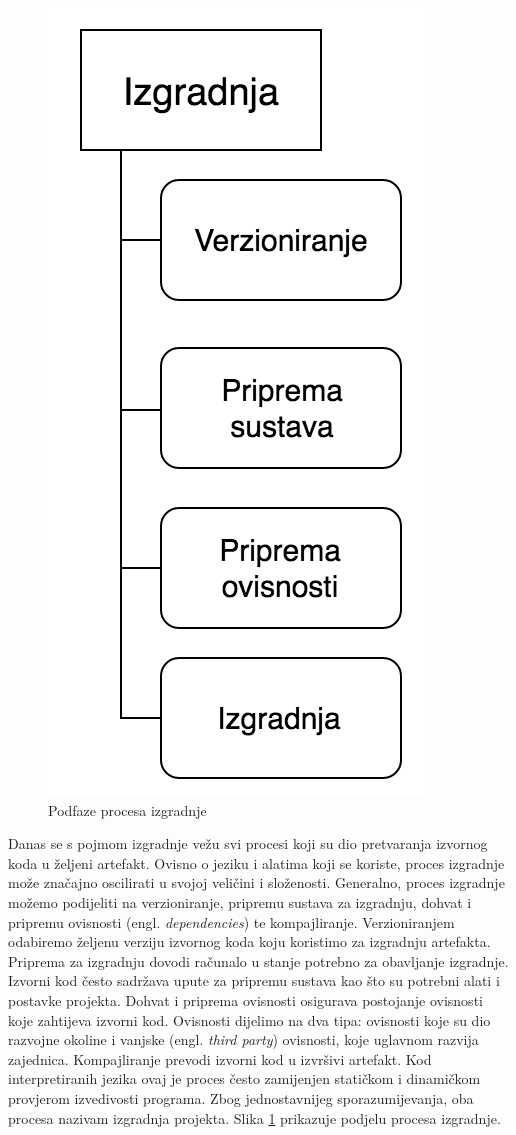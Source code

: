 \documentclass[times, utf8, diplomski, numeric]{fer}
\newcommand{\eng}[1]{(engl. \textit{#1})}
\begin{document}
\begin{figure}[b!]
\centering
\includegraphics[scale=0.5]{BuildProcess}
\caption{Podfaze procesa izgradnje}
\label{fig:BuildProcess}
\end{figure}

Danas se s pojmom izgradnje vežu svi procesi koji su dio pretvaranja izvornog koda u željeni artefakt. Ovisno o jeziku i alatima koji se koriste, proces izgradnje može značajno oscilirati u svojoj veličini i složenosti. Generalno, proces izgradnje možemo podijeliti na verzioniranje, pripremu sustava za izgradnju, dohvat i pripremu ovisnosti \eng{dependencies} te kompajliranje. Verzioniranjem odabiremo željenu verziju izvornog koda koju koristimo za izgradnju artefakta. Priprema za izgradnju dovodi računalo u stanje potrebno za obavljanje izgradnje. Izvorni kod često sadržava upute za pripremu sustava kao što su potrebni alati i postavke projekta. Dohvat i priprema ovisnosti osigurava postojanje ovisnosti koje zahtijeva izvorni kod. Ovisnosti dijelimo na dva tipa: ovisnosti koje su dio razvojne okoline i vanjske \eng{third party} ovisnosti, koje uglavnom razvija zajednica. Kompajliranje prevodi izvorni kod u izvršivi artefakt. Kod interpretiranih jezika ovaj je proces često zamijenjen statičkom i dinamičkom provjerom izvedivosti programa. Zbog jednostavnijeg sporazumijevanja, oba procesa nazivam izgradnja projekta. Slika \ref{fig:BuildProcess} prikazuje podjelu procesa izgradnje.
\end{document}
